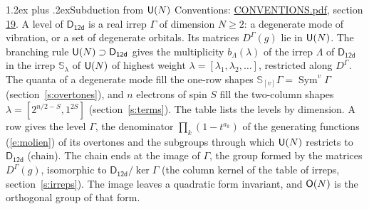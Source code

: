 \documentclass[10pt,a4paper]{article}
\makeatletter
\renewcommand\section{\@startsection{section}{1}{\z@}{-3ex plus -1ex minus -.2ex}%
  {1.2ex plus .2ex}{\normalfont\large\sffamily\bfseries\color{parttitle}}}
\numberwithin{equation}{section}
\newcommand{\grp}[1]{\mathsf{#1}}
\newcommand{\repD}[1]{D^{#1}}
\newcommand{\schur}[1]{\mathbb{S}_{#1}}
\newcommand{\shape}[1]{[#1]}
\makeatother
\begin{document}
\section{Subduction from \texorpdfstring{$\grp{U(\mathnormal{N})}$}{U(N)}}\label{s:unitary}
Conventions: \href{../../CONVENTIONS.pdf}{CONVENTIONS.pdf}, section \href{../../CONVENTIONS.pdf\#conv.19}{19}.
\leavevmode\label{n:local.level.dimension}A level of $\grp{D_{12d}}$ is a real irrep $\Gamma$ of dimension $N \ge 2$: a degenerate mode of vibration, or a set of degenerate orbitals. \label{n:group.unitary}Its matrices $\repD{\Gamma}(g)$ lie in $\grp{U(\mathnormal{N})}$. \label{n:irrep.schur}\label{n:shape.partition}\label{n:local.partition}\label{n:function.multiplicity.unitary}The branching rule $\grp{U(\mathnormal{N})} \supset \grp{D_{12d}}$ gives the multiplicity $b_\Lambda(\lambda)$ of the irrep $\Lambda$ of $\grp{D_{12d}}$ in the irrep $\schur{\lambda}$ of $\grp{U(\mathnormal{N})}$ of highest weight $\lambda = \shape{\lambda_1, \lambda_2, \dots}$, restricted along $\repD{\Gamma}$. \label{n:local.partition.power}\label{n:local.electrons}\label{n:local.spin}The quanta of a degenerate mode fill the one-row shapes $\schur{\shape{v}}\Gamma = \operatorname{Sym}^{v}\Gamma$ (section~\ref{s:overtones}), and $n$ electrons of spin $S$ fill the two-column shapes $\lambda = \shape{2^{n/2-S}, 1^{2S}}$ (section~\ref{s:terms}).
The table lists the levels by dimension. \label{n:head.level}\label{n:head.denominator}\label{n:index.overtone.denominator}\label{n:head.chain}A row gives the level $\Gamma$, the denominator $\prod_k (1 - t^{a_k})$ of the generating functions (\ref{e:molien}) of its overtones and the subgroups through which $\grp{U(\mathnormal{N})}$ restricts to $\grp{D_{12d}}$ (chain). The chain ends at the image of $\Gamma$, the group formed by the matrices $\repD{\Gamma}(g)$, isomorphic to $\grp{D_{12d}}/\ker\Gamma$ (the column kernel of the table of irreps, section~\ref{s:irreps}). The image leaves a quadratic form invariant, and $\grp{O(\mathnormal{N})}$ is the orthogonal group of that form.
\end{document}
